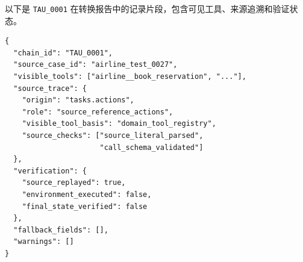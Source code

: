 以下是 \texttt{TAU\_0001} 在转换报告中的记录片段，包含可见工具、来源追溯和验证状态。

\begin{lstlisting}[basicstyle=\ttfamily\scriptsize]
{
  "chain_id": "TAU_0001",
  "source_case_id": "airline_test_0027",
  "visible_tools": ["airline__book_reservation", "..."],
  "source_trace": {
    "origin": "tasks.actions",
    "role": "source_reference_actions",
    "visible_tool_basis": "domain_tool_registry",
    "source_checks": ["source_literal_parsed",
                      "call_schema_validated"]
  },
  "verification": {
    "source_replayed": true,
    "environment_executed": false,
    "final_state_verified": false
  },
  "fallback_fields": [],
  "warnings": []
}
\end{lstlisting}
